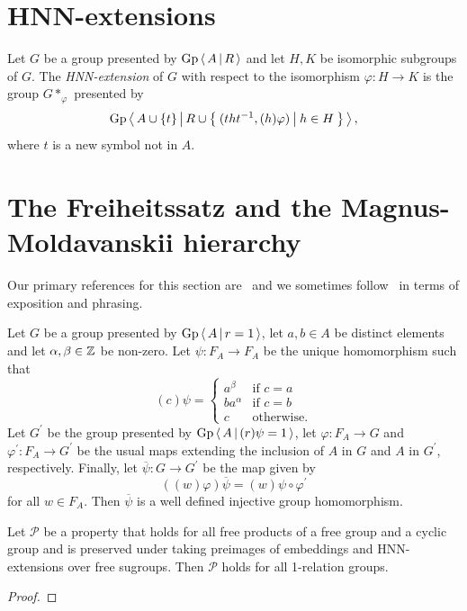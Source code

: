 \section{HNN-extensions}

\begin{definition}\label{def:hnn_extension}
	Let $G$ be a group presented by $\mathrm{Gp}\left\langle\, A \,\middle|\, R \,\right\rangle$ and let $H, K$ be isomorphic subgroups of $G$.
	The \emph{HNN-extension} of $G$ with respect to the isomorphism $\varphi: H \rightarrow K$ is the group
	$G\ast_\varphi$ presented by
	\[\mathrm{Gp}\left\langle\, A\cup \{t\} \,\middle|\, R\cup\left\{\: (t h t^{-1}, (h)\varphi) \: \middle|\: h\in H \:\right\} \,\right\rangle,\]
	where $t$ is a new symbol not in $A$.
\end{definition}

\section{The Freiheitssatz and the Magnus-Moldavanskii hierarchy}

Our primary references for this section are~\cite{Moldavanskii1967aa,McCool1973aa,Linton2025aa} and we sometimes
follow~\cite{PutnamYYYYaa} in terms of exposition and phrasing.

\begin{lemma}\label{lem:1rel_group_embedding}
	Let $G$ be a group presented by $\mathrm{Gp}\left\langle\, A \,\middle|\, r = 1 \,\right\rangle$, let $a, b\in A$ be distinct elements and let
	$\alpha, \beta\in \mathbb{Z}$ be non-zero.
	Let $\psi: F_A \rightarrow F_A$ be the unique homomorphism such that
	\[
		(c)\psi = \begin{cases}
			a^\beta   & \text{if }c=a     \\
			ba^\alpha & \text{if }c=b     \\
			c         & \text{otherwise}.
		\end{cases}
	\]
	Let $G^\prime$ be the group presented by $\mathrm{Gp}\left\langle\, A \,\middle|\, (r)\psi = 1 \,\right\rangle$, let $\varphi:F_A\rightarrow G$ and
	$\varphi^\prime: F_A\rightarrow G^\prime$ be the usual maps extending the inclusion of $A$ in $G$ and $A$ in
	$G^\prime$, respectively. Finally, let $\overline{\psi}: G\rightarrow G^\prime$ be the map given by
	\[((w)\varphi)\overline{\psi} = (w)\psi \circ \varphi^\prime\]
	for all $w\in F_A$. Then $\overline{\psi}$ is a well defined injective group homomorphism.
\end{lemma}

\begin{lemma}\label{lem:Magnus_induction_principle}
	Let $\mathscr{P}$ be a property that holds for all free products of a free group and a cyclic group and is preserved
	under taking preimages of embeddings and HNN-extensions over free sugroups. Then $\mathscr{P}$ holds for all
	1-relation groups.
\end{lemma}
\begin{proof}
\end{proof}


